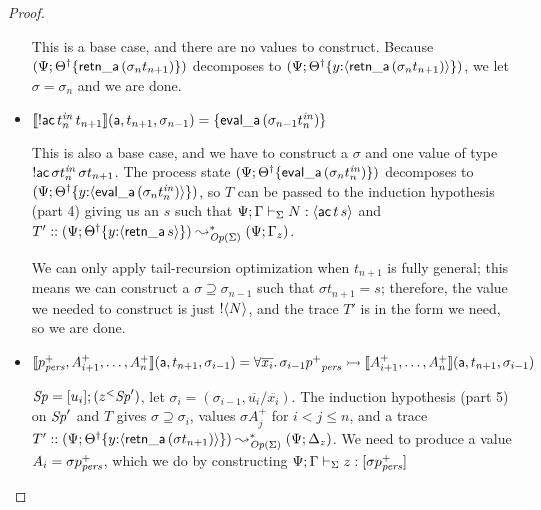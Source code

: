 \begin{proof}
\begin{itemize}
  \bigskip
  This is a base case, and there are no values to construct. Because
  $(\Psi; {{{\Theta}^\dag}}\{{{\sf retn\_a}\,(\sigma_{n}{t_{n+1}})}\})$
  decomposes to 
  $(\Psi; {{{\Theta}^\dag}}\{{y{:}\langle {{\sf retn\_a}\,(\sigma_{n}{t_{n+1}})} \rangle}\})$, we let $\sigma = \sigma_n$ and we are done.
  \bigskip

\item $\llbracket {{!}{\sf ac}\,t^{\it in}_n\,t_{n+1}} \rrbracket({\sf a},{t_{n+1}},{\sigma_{n-1}}) 
  = \{{\sf eval\_a}\,(\sigma_{n-1}{t^{\it in}_n})\}$

  \bigskip
  This is also a base case, and we have to construct a $\sigma$ and one value
  of type ${!}{\sf ac}\,{\sigma}t^{\it in}_n\,{\sigma}t_{n+1}$. The
  process state  
  $(\Psi; {{{\Theta}^\dag}}\{{{\sf eval\_a}\,(\sigma_{n}{t^{\it in}_{n}})}\})$
  decomposes to 
  $(\Psi; {{{\Theta}^\dag}}\{{y{:}\langle {{\sf eval\_a}\,(\sigma_{n}{t^{\it in}_{n}})} \rangle}\})$,
  so $T$ can be passed to the induction hypothesis 
  (part 4) giving us an $s$ such that 
  ${\Psi}; {\Gamma} \vdash_{\Sigma} {N} : {\langle {{\sf ac}\,t\,s} \rangle}$ and
  $T' :: (\Psi; {{{\Theta}^\dag}}\{{y{:}\langle {{\sf retn\_a}\,s} \rangle}\}) 
   \leadsto^*_{{\it Op}({\Sigma})}
  (\Psi; \Gamma_z)$. 

  \smallskip
  We can only apply tail-recursion optimization when $t_{n+1}$ is 
  fully general; this means we can construct
  a $\sigma \supseteq \sigma_{n-1}$ such that $\sigma{t_{n+1}} = s$;
  therefore, the value we needed to construct is just 
  ${!}{\langle {N} \rangle}$, and the trace $T'$ is in the form we need,
  so we are done.
  \bigskip

\item $\llbracket {p^+_{\it pers},A^+_{i+1},\ldots,A^+_n} \rrbracket({\sf a},{t_{n+1}},{\sigma_{i-1}}) 
  = \forall \overline{x_i}.\, \sigma_{i-1}{p^+}_{\it pers} \rightarrowtail \llbracket {A^+_{i+1},\ldots,A^+_n} \rrbracket({\sf a},{t_{n+1}},{\sigma_{i-1}})$
 
  \bigskip
  ${\it Sp} = [{u_i}]; {({z}{^{<}}{{\it Sp}'})}$,
  let $\sigma_i = (\sigma_{i-1},\overline{u_i}/\overline{x_i})$. The
  induction hypothesis (part 5) on ${\it Sp}'$ and $T$
  gives $\sigma \supseteq \sigma_{i}$, values
  $\sigma{A^+_{j}}$ for $i < j \leq n$, and 
  a trace $T' :: (\Psi; {{{\Theta}^\dag}}\{{y{:}\langle {{\sf retn\_a}\,(\sigma t_{n+1})} \rangle}\})
  \leadsto^*_{{\it Op}({\Sigma})}
 (\Psi; \Delta_z)$. We need to produce a value $A_i = \sigma{p^+_{\it pers}}$, which
  we do by constructing 
  ${\Psi}; {\Gamma} \vdash_{\Sigma} {z} : {[\sigma{p^+_{\it pers}}]}$
  \bigskip


\end{itemize}
\end{proof}
